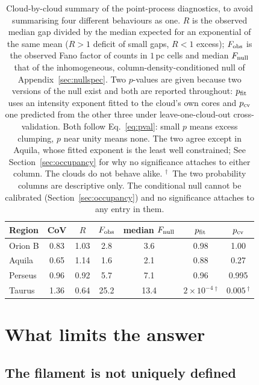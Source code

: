 \documentclass[usenatbib,twoside,twocolumn]{mnras}
\begin{document}
\begin{table}
\caption{Cloud-by-cloud summary of the point-process diagnostics, to avoid summarising four different behaviours as one. $R$ is the observed median gap divided by the median expected for an exponential of the same mean ($R>1$ deficit of small gaps, $R<1$ excess); $F_{\rm obs}$ is the observed Fano factor of counts in $1$\,pc cells and median $F_{\rm null}$ that of the inhomogeneous, column-density-conditioned null of Appendix~\ref{sec:nullspec}. Two $p$-values are given because two versions of the null exist and both are reported throughout: $p_{\rm fit}$ uses an intensity exponent fitted to the cloud's own cores and $p_{\rm cv}$ one predicted from the other three under leave-one-cloud-out cross-validation. Both follow Eq.~\ref{eq:pval}: small $p$ means excess clumping, $p$ near unity means none. The two agree except in Aquila, whose fitted exponent is the least well constrained; See Section~\ref{sec:occupancy} for why no significance attaches to either column. The clouds do not behave alike. $^{\dagger}$~The two probability columns are descriptive only. The conditional null cannot be calibrated (Section~\ref{sec:occupancy}) and no significance attaches to any entry in them.}
\label{tab:percloud}
\footnotesize
\setlength{\tabcolsep}{3.5pt}
\begin{tabular}{lcccccc}
\toprule
Region & CoV & $R$ & $F_{\rm obs}$ & median $F_{\rm null}$ & $p_{\rm fit}$ & $p_{\rm cv}$ \\
\midrule
Orion B & 0.83 & 1.03 & 2.8  & 3.6  & 0.98 & 1.00 \\
Aquila  & 0.65 & 1.14 & 1.6  & 2.1  & 0.88 & 0.27 \\
Perseus & 0.96 & 0.92 & 5.7  & 7.1  & 0.96 & 0.995 \\
Taurus  & 1.36 & 0.64 & 25.2 & 13.4 & $2\times10^{-4}$\,$^{\dagger}$ & $0.005$\,$^{\dagger}$ \\
\bottomrule
\end{tabular}
\end{table}


\section{What limits the answer}
\label{sec:ontology}

\subsection{The filament is not uniquely defined}
\end{document}

